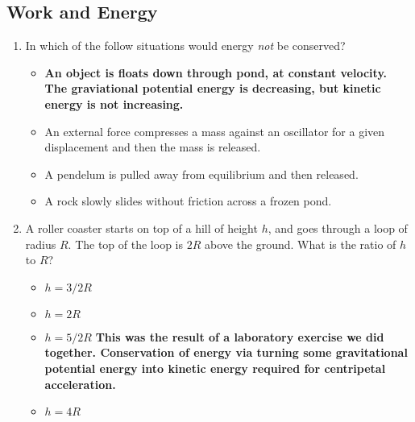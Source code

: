 \documentclass[10pt]{article}
\begin{document}
\subsection{Work and Energy}
\begin{enumerate}
\item In which of the follow situations would energy \textit{not} be conserved?
\begin{itemize}
\item \textbf{An object is floats down through pond, at constant velocity.  The graviational potential energy is decreasing, but kinetic energy is not increasing.}
\item An external force compresses a mass against an oscillator for a given displacement and then the mass is released.
\item A pendelum is pulled away from equilibrium and then released.
\item A rock slowly slides without friction across a frozen pond.
\end{itemize}
\item A roller coaster starts on top of a hill of height $h$, and goes through a loop of radius $R$.  The top of the loop is $2R$ above the ground.  What is the ratio of $h$ to $R$?
\begin{itemize}
\item $h = 3/2 R$
\item $h = 2 R$
\item $h = 5/2 R$ \textbf{This was the result of a laboratory exercise we did together.  Conservation of energy via turning some gravitational potential energy into kinetic energy required for centripetal acceleration.}
\item $h = 4 R$
\end{itemize}
\end{enumerate}
\end{document}
